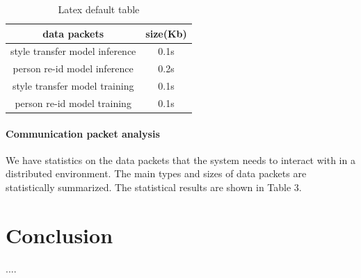 \documentclass{article}
\begin{document}
\begin{table}
\centering
\begin{tabular}{c|c}
\hline
data packets  & size(Kb) \\
\hline
style transfer model inference   & 0.1s  \\
person re-id model inference     & 0.2s  \\
style transfer model training    & 0.1s  \\
person re-id model training      & 0.1s  \\
\hline
\end{tabular}
\caption{Latex default table}
\label{tab:plain}
\end{table}

\paragraph{Communication packet analysis} 
We have statistics on the data packets that the system needs to interact with in a distributed environment. The main types and sizes of data packets are statistically summarized. The statistical results are shown in Table 3.


\section{Conclusion}
....
\end{document}
